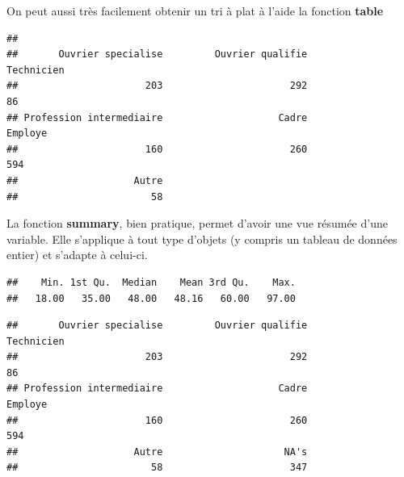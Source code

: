 \documentclass[
]{book}
\newenvironment{Shaded}{\begin{snugshade}}{\end{snugshade}}
\newcommand{\FunctionTok}[1]{\textcolor[rgb]{0.00,0.00,0.00}{#1}}
\newcommand{\NormalTok}[1]{#1}
\newcommand{\SpecialCharTok}[1]{\textcolor[rgb]{0.00,0.00,0.00}{#1}}
\begin{document}
On peut aussi très facilement obtenir un tri à plat à l'aide la fonction \textbf{table}

\begin{Shaded}
\end{Shaded}

\begin{verbatim}
## 
##       Ouvrier specialise         Ouvrier qualifie               Technicien 
##                      203                      292                       86 
## Profession intermediaire                    Cadre                  Employe 
##                      160                      260                      594 
##                    Autre 
##                       58
\end{verbatim}

La fonction \textbf{summary}, bien pratique, permet d'avoir une vue résumée d'une variable. Elle s'applique à tout type d'objets (y compris un tableau de données entier) et s'adapte à celui-ci.

\begin{Shaded}
\end{Shaded}

\begin{verbatim}
##    Min. 1st Qu.  Median    Mean 3rd Qu.    Max. 
##   18.00   35.00   48.00   48.16   60.00   97.00
\end{verbatim}

\begin{Shaded}
\end{Shaded}

\begin{verbatim}
##       Ouvrier specialise         Ouvrier qualifie               Technicien 
##                      203                      292                       86 
## Profession intermediaire                    Cadre                  Employe 
##                      160                      260                      594 
##                    Autre                     NA's 
##                       58                      347
\end{verbatim}
\end{document}
